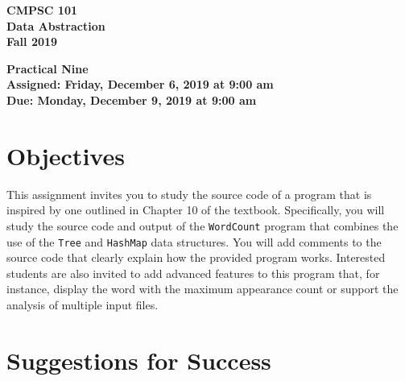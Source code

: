 \documentclass[11pt]{article}
\newcommand{\assignmentduedate}{December 9}
\newcommand{\assignmentassignedate}{December 6}
\newcommand{\assignmentnumber}{Nine}
\newcommand{\labyear}{2019}
\newcommand{\labday}{Friday}
\newcommand{\labdueday}{Monday}
\newcommand{\labtime}{9:00 am}
\newcommand{\assigneddate}{Assigned: \labday, \assignmentassignedate, \labyear{} at \labtime{}}
\newcommand{\duedate}{Due: \labdueday, \assignmentduedate, \labyear{} at \labtime{}}
\newcommand{\mainprogram}{\lstinline{WordCount}}
\newcommand{\program}[1]{\lstinline{#1}}
\newcommand{\labtitle}[1]
{
  \begin{center}
    \begin{center}
      \bf
      CMPSC 101\\Data Abstraction\\
      Fall 2019\\
      \medskip
    \end{center}
    \bf
    #1
  \end{center}
}
\begin{document}
\thispagestyle{empty}

\labtitle{Practical \assignmentnumber{} \\ \assigneddate{} \\ \duedate{}}

\section*{Objectives}

This assignment invites you to study the source code of a program that is
inspired by one outlined in Chapter 10 of the textbook. Specifically, you will
study the source code and output of the \mainprogram{} program that combines the
use of the \program{Tree} and \program{HashMap} data structures. You will add
comments to the source code that clearly explain how the provided program works.
Interested students are also invited to add advanced features to this program
that, for instance, display the word with the maximum appearance count or
support the analysis of multiple input files.

\section*{Suggestions for Success}
\end{document}
